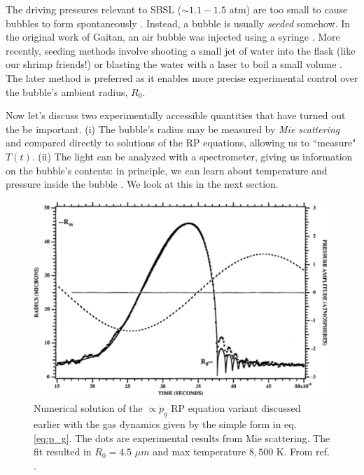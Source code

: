 \documentclass[11pt,prb,aps,nofootinbib,superscriptaddress,floatfix]{revtex4-2}
\begin{document}

The driving pressures relevant to SBSL ($\sim 1.1-1.5$ atm) are too small to cause bubbles to form spontaneously \cite{brenner2002single}. Instead, a bubble is usually \emph{seeded} somehow. In the original work of Gaitan, an air bubble was injected using a syringe \cite{gaitan1992sonoluminescence}. More recently, seeding methods involve shooting a small jet of water into the flask (like our shrimp friends!) or blasting the water with a laser to boil a small volume \cite{suslick2008inside,yasui2018acoustic}. The later method is preferred as it enables more precise experimental control over the bubble's ambient radius, $R_0$.

Now let's discuss two experimentally accessible quantities that have turned out the be important. (i) The bubble's radius may be measured by \emph{Mie scattering} and compared directly to solutions of the RP equations, allowing us to ``measure" $T(t)$. (ii) The light can be analyzed with a spectrometer, giving us information on the bubble's contents: in principle, we can learn about temperature and pressure inside the bubble \cite{hiller1992spectrum,hilgenfeldt1999simple,flannigan2005plasma,flannigan2005plasma1,flannigan2006measurement}. We look at this in the next section.

\begin{figure}
\includegraphics[width=0.6\linewidth]{figs/mie.pdf}
    \caption{Numerical solution of the $\propto \dot{p}_g$ RP equation variant discussed earlier with the gas dynamics given by the simple form in eq. \ref{eq:p_g}. The dots are experimental results from Mie scattering. The fit resulted in $R_0=4.5$ $\mu m$ and max temperature $8,500$ K. From ref. \cite{lofstedt1993toward}.}
\label{fig:mie}
\end{figure}
\end{document}
